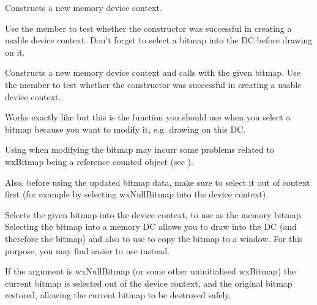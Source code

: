 
Constructs a new memory device context.

Use the  member to test whether the constructor was successful
in creating a usable device context.
Don't forget to select a bitmap into the DC before drawing on it.


Constructs a new memory device context and calls 
with the given bitmap.
Use the  member to test whether the constructor was successful
in creating a usable device context.


\label{wxmemorydcselectobject}


Works exactly like  but
this is the function you should use when you select a bitmap because you want to modify
it, e.g. drawing on this DC.

Using  when modifying
the bitmap may incurr some problems related to wxBitmap being a reference counted object
(see ).

Also, before using the updated bitmap data, make sure to select it out of context first
(for example by selecting wxNullBitmap into the device context).





\label{wxmemorydcselectobjectassource}


Selects the given bitmap into the device context, to use as the memory
bitmap. Selecting the bitmap into a memory DC allows you to draw into
the DC (and therefore the bitmap) and also to use  to copy
the bitmap to a window. For this purpose, you may find \rtfsp
easier to use instead.

If the argument is wxNullBitmap (or some other uninitialised wxBitmap) the current bitmap is
selected out of the device context, and the original bitmap restored, allowing the current bitmap to
be destroyed safely.



